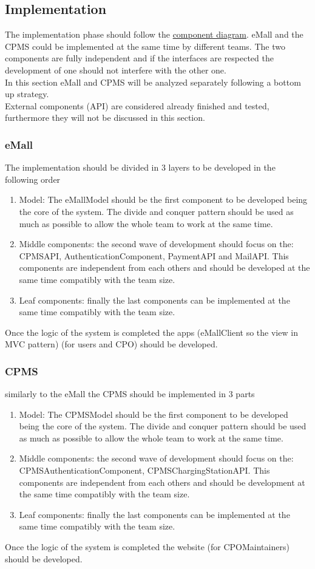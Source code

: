 \subsection{Implementation}
The implementation phase should follow the \hyperref[fig:eMSP-component]{component diagram}. \ac{eMall} and the \ac{CPMS} could be implemented at the same time by different teams. The two components are fully independent and if the interfaces are respected the development of one should not interfere with the other one.\\
In this section \ac{eMall} and \ac{CPMS} will be analyzed separately following a bottom up strategy.\\
External components (\ac{API}) are considered already finished and tested, furthermore they will not be discussed in this section.
\subsubsection{eMall}
The implementation should be divided in 3 layers to be developed in the following order
\begin{enumerate}
    \item Model: The eMallModel should be the first component to be developed being the core of the system. The divide and conquer pattern should be used as much as possible to allow the whole team to work at the same time.
    \item Middle components: the second wave of development should focus on the: \ac{CPMS}\ac{API}, AuthenticationComponent, Payment\ac{API} and Mail\ac{API}. This components are independent from each others and should be developed at the same time compatibly with the team size.
    \item Leaf components: finally the last components can be implemented at the same time compatibly with the team size.
\end{enumerate}
Once the logic of the system is completed the apps (eMallClient so the view in \ac{MVC} pattern) (for users and \ac{CPO}) should be developed.
\subsubsection{CPMS}
similarly to the \ac{eMall} the \ac{CPMS} should be implemented in 3 parts
\begin{enumerate}
    \item Model: The CPMSModel should be the first component to be developed being the core of the system. The divide and conquer pattern should be used as much as possible to allow the whole team to work at the same time.
    \item Middle components: the second wave of development should focus on the: CPMSAuthenticationComponent, CPMSChargingStation\ac{API}. This components are independent from each others and should be development at the same time compatibly with the team size.
    \item Leaf components: finally the last components can be implemented at the same time compatibly with the team size.
\end{enumerate}
Once the logic of the system is completed the website (for \ac{CPO}Maintainers) should be developed.
